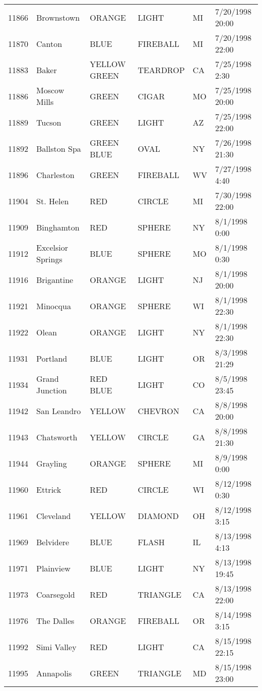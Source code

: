 \begin{tabular}{llllll}
11866 & Brownstown & ORANGE & LIGHT & MI & 7/20/1998 20:00 \\
11870 & Canton & BLUE & FIREBALL & MI & 7/20/1998 22:00 \\
11883 & Baker & YELLOW GREEN & TEARDROP & CA & 7/25/1998 2:30 \\
11886 & Moscow Mills & GREEN & CIGAR & MO & 7/25/1998 20:00 \\
11889 & Tucson & GREEN & LIGHT & AZ & 7/25/1998 22:00 \\
11892 & Ballston Spa & GREEN BLUE & OVAL & NY & 7/26/1998 21:30 \\
11896 & Charleston & GREEN & FIREBALL & WV & 7/27/1998 4:40 \\
11904 & St. Helen & RED & CIRCLE & MI & 7/30/1998 22:00 \\
11909 & Binghamton & RED & SPHERE & NY & 8/1/1998 0:00 \\
11912 & Excelsior Springs & BLUE & SPHERE & MO & 8/1/1998 0:30 \\
11916 & Brigantine & ORANGE & LIGHT & NJ & 8/1/1998 20:00 \\
11921 & Minocqua & ORANGE & SPHERE & WI & 8/1/1998 22:30 \\
11922 & Olean & ORANGE & LIGHT & NY & 8/1/1998 22:30 \\
11931 & Portland & BLUE & LIGHT & OR & 8/3/1998 21:29 \\
11934 & Grand Junction & RED BLUE & LIGHT & CO & 8/5/1998 23:45 \\
11942 & San Leandro & YELLOW & CHEVRON & CA & 8/8/1998 20:00 \\
11943 & Chatsworth & YELLOW & CIRCLE & GA & 8/8/1998 21:30 \\
11944 & Grayling & ORANGE & SPHERE & MI & 8/9/1998 0:00 \\
11960 & Ettrick & RED & CIRCLE & WI & 8/12/1998 0:30 \\
11961 & Cleveland & YELLOW & DIAMOND & OH & 8/12/1998 3:15 \\
11969 & Belvidere & BLUE & FLASH & IL & 8/13/1998 4:13 \\
11971 & Plainview & BLUE & LIGHT & NY & 8/13/1998 19:45 \\
11973 & Coarsegold & RED & TRIANGLE & CA & 8/13/1998 22:00 \\
11976 & The Dalles & ORANGE & FIREBALL & OR & 8/14/1998 3:15 \\
11992 & Simi Valley & RED & LIGHT & CA & 8/15/1998 22:15 \\
11995 & Annapolis & GREEN & TRIANGLE & MD & 8/15/1998 23:00 \\

\end{tabular}
